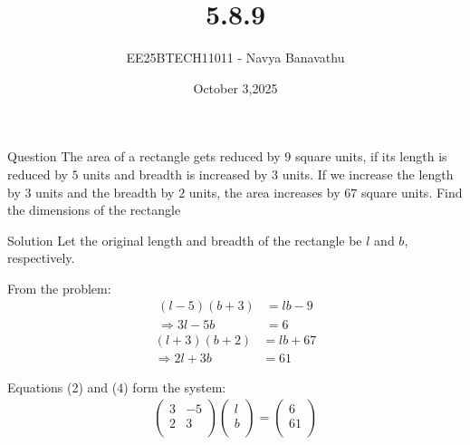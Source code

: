 \documentclass{beamer}
\title{5.8.9}
\date{October 3,2025}
\author{EE25BTECH11011 - Navya Banavathu}
\begin{document}
\frame{\titlepage}

\begin{frame}{Question}
 The area of a rectangle gets reduced by $9$ square units, if its length is reduced by $5$ units and breadth is increased by $3$ units. If we increase the length by $3$ units and the breadth by $2$ units, the area increases by $67$ square units. Find the dimensions of the rectangle
\end{frame}

\begin{frame}{Solution}
Let the original length and breadth of the rectangle be $l$ and $b$, respectively.

From the problem:
\begin{align}
(l - 5)(b + 3) &= lb - 9  \\
\Rightarrow 3l - 5b &= 6 
\end{align}
\begin{align}
(l + 3)(b + 2) &= lb + 67 \\
\Rightarrow 2l + 3b &= 61 
\end{align}

Equations (2) and (4) form the system:
\begin{align}
\begin{pmatrix}
3 & -5 \\
2 & 3 \\
\end{pmatrix}
\begin{pmatrix}
l \\
b \\
\end{pmatrix}
=
\begin{pmatrix}
6 \\
61 \\
\end{pmatrix}
\end{align}

\end{frame}
\end{document}
